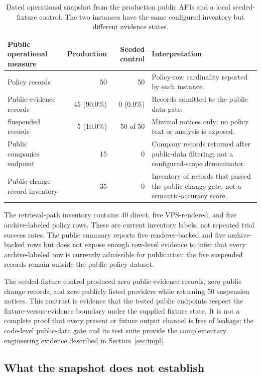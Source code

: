 \documentclass[11pt]{article}
\begin{document}
\begin{table}[htbp]
\centering
\small
\begin{tabularx}{\textwidth}{@{}l r r X@{}}
\toprule
\textbf{Public operational measure} & \textbf{Production} & \textbf{Seeded control} & \textbf{Interpretation} \\
\midrule
Policy records & 50 & 50 & Policy-row cardinality reported by each instance. \\
Public-evidence records & 45 (90.0\%) & 0 (0.0\%) & Records admitted to the public data gate. \\
Suspended records & 5 (10.0\%) & 50 of 50 & Minimal notices only; no policy text or analysis is exposed. \\
Public companies endpoint & 15 & 0 & Company records returned after public-data filtering; not a configured-scope denominator. \\
Public change-record inventory & 35 & 0 & Inventory of records that passed the public change gate, not a semantic-accuracy score. \\
\bottomrule
\end{tabularx}
\caption{Dated operational snapshot from the production public APIs and a local
seeded-fixture control. The two instances have the same configured inventory but
different evidence states.}
\label{tab:eval}
\end{table}
\FloatBarrier

The retrieval-path inventory contains 40 direct, five VPS-rendered, and five
archive-labeled policy rows. These are current inventory labels, not repeated
trial success rates. The public summary reports five renderer-backed and five
archive-backed rows but does not expose enough row-level evidence to infer that
every archive-labeled row is currently admissible for publication; the five
suspended records remain outside the public policy dataset.

The seeded-fixture control produced zero public-evidence records, zero public
change records, and zero publicly listed providers while returning 50 suspension
notices. This contrast is evidence that the tested public endpoints respect the
fixture-versus-evidence boundary under the supplied fixture state. It is not a
complete proof that every present or future output channel is free of leakage;
the code-level public-data gate and its test suite provide the complementary
engineering evidence described in Section~\ref{sec:impl}.

\subsection{What the snapshot does not establish}
\end{document}
